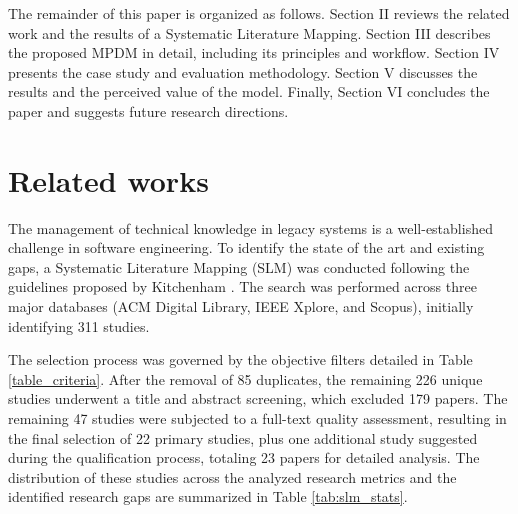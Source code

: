 \documentclass{ieeeaccess}
\begin{document}
The remainder of this paper is organized as follows. Section II reviews the related work and the results of a Systematic Literature Mapping. Section III describes the proposed MPDM in detail, including its principles and workflow. Section IV presents the case study and evaluation methodology. Section V discusses the results and the perceived value of the model. Finally, Section VI concludes the paper and suggests future research directions.


\section{Related works}
The management of technical knowledge in legacy systems is a well-established challenge in software engineering. To identify the state of the art and existing gaps, a Systematic Literature Mapping (SLM) was conducted following the guidelines proposed by Kitchenham \cite{kitchenham}. The search was performed across three major databases (ACM Digital Library, IEEE Xplore, and Scopus), initially identifying 311 studies. 

The selection process was governed by the objective filters detailed in Table \ref{table_criteria}. After the removal of 85 duplicates, the remaining 226 unique studies underwent a title and abstract screening, which excluded 179 papers. The remaining 47 studies were subjected to a full-text quality assessment, resulting in the final selection of 22 primary studies, plus one additional study suggested during the qualification process, totaling 23 papers for detailed analysis. The distribution of these studies across the analyzed research metrics and the identified research gaps are summarized in Table \ref{tab:slm_stats}.
\end{document}
